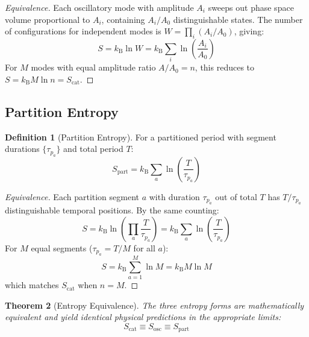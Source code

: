 \documentclass[twocolumn,10pt,a4paper]{article}
\theoremstyle{plain}
\newtheorem{theorem}{Theorem}[section]
\theoremstyle{definition}
\newtheorem{definition}[theorem]{Definition}
\theoremstyle{remark}
\newcommand{\kB}{k_{\mathrm{B}}}
\newcommand{\taup}{\tau_p}
\begin{document}
\begin{proof}[Equivalence]
Each oscillatory mode with amplitude $A_i$ sweeps out phase space volume proportional to $A_i$, containing $A_i/A_0$ distinguishable states. The number of configurations for independent modes is $W = \prod_i (A_i/A_0)$, giving:
\begin{equation}
    S = \kB \ln W = \kB \sum_i \ln\!\left(\frac{A_i}{A_0}\right)
\end{equation}
For $M$ modes with equal amplitude ratio $A/A_0 = n$, this reduces to $S = \kB M \ln n = S_{\mathrm{cat}}$.
\end{proof}

\subsection{Partition Entropy}

\begin{definition}[Partition Entropy]
For a partitioned period with segment durations $\{\taup_a\}$ and total period $T$:
\begin{equation}
    S_{\mathrm{part}} = \kB \sum_a \ln\!\left(\frac{T}{\taup_a}\right)
\end{equation}
\end{definition}

\begin{proof}[Equivalence]
Each partition segment $a$ with duration $\taup_a$ out of total $T$ has $T/\taup_a$ distinguishable temporal positions. By the same counting:
\begin{equation}
    S = \kB \ln\!\left(\prod_a \frac{T}{\taup_a}\right) = \kB \sum_a \ln\!\left(\frac{T}{\taup_a}\right)
\end{equation}
For $M$ equal segments ($\taup_a = T/M$ for all $a$):
\begin{equation}
    S = \kB \sum_{a=1}^{M} \ln M = \kB M \ln M
\end{equation}
which matches $S_{\mathrm{cat}}$ when $n = M$.
\end{proof}

\begin{theorem}[Entropy Equivalence]
\label{thm:entropy_equiv}
The three entropy forms are mathematically equivalent and yield identical physical predictions in the appropriate limits:
\begin{equation}
    S_{\mathrm{cat}} \equiv S_{\mathrm{osc}} \equiv S_{\mathrm{part}}
\end{equation}
\end{theorem}
\end{document}
